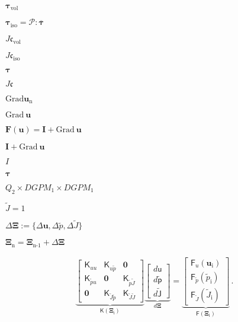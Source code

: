 \documentclass{article}
\begin{document}
$\boldsymbol{\tau}_{\textrm{vol}}$
\pagebreak

$\boldsymbol{\tau}_{\textrm{iso}} = \mathcal{P}:\overline{\boldsymbol{\tau}}$
\pagebreak

$J \mathfrak{c}_\textrm{vol}$
\pagebreak

$J \mathfrak{c}_\textrm{iso}$
\pagebreak

$\boldsymbol{\tau}$
\pagebreak

$J\mathfrak{c}$
\pagebreak

$\textrm{Grad}\mathbf{u}_{\textrm{n}}$
\pagebreak

$\textrm{Grad}\ \mathbf{u}$
\pagebreak

$\mathbf{F}(\mathbf{u}) = \mathbf{I} + \textrm{Grad}\ \mathbf{u}$
\pagebreak

$\mathbf{I} + \textrm{Grad}\ \mathbf{u}$
\pagebreak

$I$
\pagebreak

$\mathbf{\tau}$
\pagebreak

$Q_2 \times DGPM_1 \times DGPM_1$
\pagebreak

$\widetilde{J}=1$
\pagebreak

$\varDelta \mathbf{\Xi}:= \{\varDelta \mathbf{u},\varDelta \widetilde{p}, \varDelta \widetilde{J} \}$
\pagebreak

$\mathbf{\Xi}_{\textrm{n}} = \mathbf{\Xi}_{\textrm{n-1}} + \varDelta \mathbf{\Xi}$
\pagebreak

\begin{align*} \underbrace{\begin{bmatrix} \mathbf{\mathsf{K}}_{uu} & \mathbf{\mathsf{K}}_{u\widetilde{p}} & \mathbf{0} \\ \mathbf{\mathsf{K}}_{\widetilde{p}u} & \mathbf{0} & \mathbf{\mathsf{K}}_{\widetilde{p}\widetilde{J}} \\ \mathbf{0} & \mathbf{\mathsf{K}}_{\widetilde{J}\widetilde{p}} & \mathbf{\mathsf{K}}_{\widetilde{J}\widetilde{J}} \end{bmatrix}}_{\mathbf{\mathsf{K}}(\mathbf{\Xi}_{\textrm{i}})} \underbrace{\begin{bmatrix} d \mathbf{\mathsf{u}} \\ d \widetilde{\mathbf{\mathsf{p}}} \\ d \widetilde{\mathbf{\mathsf{J}}} \end{bmatrix}}_{d \mathbf{\Xi}} = \underbrace{\begin{bmatrix} \mathbf{\mathsf{F}}_{u}(\mathbf{u}_{\textrm{i}}) \\ \mathbf{\mathsf{F}}_{\widetilde{p}}(\widetilde{p}_{\textrm{i}}) \\ \mathbf{\mathsf{F}}_{\widetilde{J}}(\widetilde{J}_{\textrm{i}}) \end{bmatrix}}_{ \mathbf{\mathsf{F}}(\mathbf{\Xi}_{\textrm{i}}) } \, . \end{align*}
\pagebreak
\end{document}
